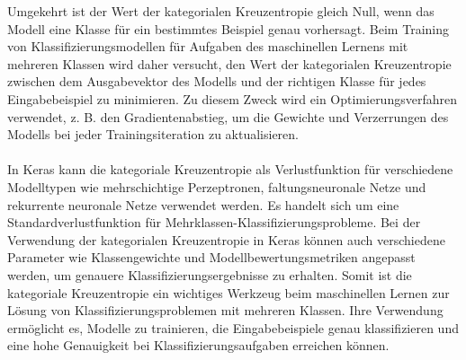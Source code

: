 Umgekehrt ist der Wert der kategorialen Kreuzentropie gleich Null, wenn das Modell eine Klasse für ein bestimmtes Beispiel genau vorhersagt.
Beim Training von Klassifizierungsmodellen für Aufgaben des maschinellen Lernens mit mehreren Klassen wird daher versucht, den Wert der kategorialen Kreuzentropie zwischen dem Ausgabevektor des Modells und der richtigen Klasse für jedes Eingabebeispiel zu minimieren. 
Zu diesem Zweck wird ein Optimierungsverfahren verwendet, z. B. den Gradientenabstieg, um die Gewichte und Verzerrungen des Modells bei jeder Trainingsiteration zu aktualisieren.\\\\
In Keras kann die kategoriale Kreuzentropie als Verlustfunktion für verschiedene Modelltypen wie mehrschichtige Perzeptronen, faltungsneuronale Netze und rekurrente neuronale Netze verwendet werden. 
Es handelt sich um eine Standardverlustfunktion für Mehrklassen-Klassifizierungsprobleme. 
Bei der Verwendung der kategorialen Kreuzentropie in Keras können auch verschiedene Parameter wie Klassengewichte und Modellbewertungsmetriken angepasst werden, um genauere Klassifizierungsergebnisse zu erhalten. 
Somit ist die kategoriale Kreuzentropie ein wichtiges Werkzeug beim maschinellen Lernen zur Lösung von Klassifizierungsproblemen mit mehreren Klassen. 
Ihre Verwendung ermöglicht es, Modelle zu trainieren, die Eingabebeispiele genau klassifizieren und eine hohe Genauigkeit bei Klassifizierungsaufgaben erreichen können.

\endinput